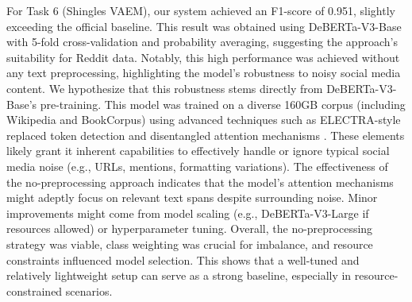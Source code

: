\documentclass[letterpaper]{article} %
\begin{document}
For Task 6 (Shingles VAEM), our system achieved an F1-score of 0.951, slightly exceeding the official baseline. This result was obtained using DeBERTa-V3-Base with 5-fold cross-validation and probability averaging, suggesting the approach's suitability for Reddit data. Notably, this high performance was achieved without any text preprocessing, highlighting the model's robustness to noisy social media content. We hypothesize that this robustness stems directly from DeBERTa-V3-Base's pre-training. This model was trained on a diverse 160GB corpus (including Wikipedia and BookCorpus) using advanced techniques such as ELECTRA-style replaced token detection and disentangled attention mechanisms \cite{he2021debertav3}. These elements likely grant it inherent capabilities to effectively handle or ignore typical social media noise (e.g., URLs, mentions, formatting variations).
The effectiveness of the no-preprocessing approach indicates that the model's attention mechanisms might adeptly focus on relevant text spans despite surrounding noise. 
Minor improvements might come from model scaling (e.g., DeBERTa-V3-Large if resources allowed) or hyperparameter tuning. Overall, the no-preprocessing strategy was viable, class weighting was crucial for imbalance, and resource constraints influenced model selection.
This shows that a well-tuned and relatively lightweight setup can serve as a strong baseline, especially in resource-constrained scenarios.




\end{document}
